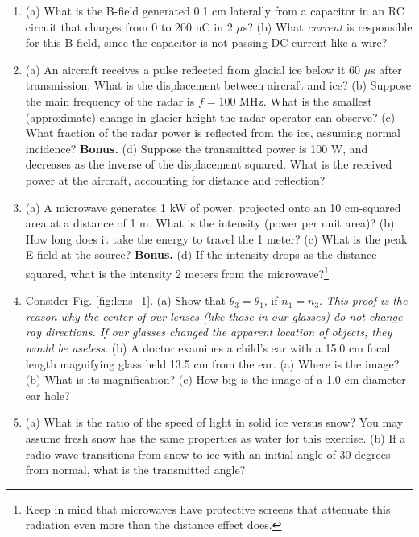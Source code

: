 \documentclass[12pt,twocolumn]{article}
\begin{document}
\noindent
\begin{enumerate}
\item (a) What is the B-field generated 0.1 cm laterally from a capacitor in an RC circuit that charges from 0 to 200 nC in 2 $\mu$s? (b) What \textit{current} is responsible for this B-field, since the capacitor is not passing DC current like a wire? \\ \vspace{1.5cm}
\item (a) An aircraft receives a pulse reflected from glacial ice below it $60$ $\mu$s after transmission. What is the displacement between aircraft and ice? (b) Suppose the main frequency of the radar is $f = 100$ MHz.  What is the smallest (approximate) change in glacier height the radar operator can observe? (c) What fraction of the radar power is reflected from the ice, assuming normal incidence? \textbf{Bonus.} (d) Suppose the transmitted power is 100 W, and decreases as the inverse of the displacement squared.  What is the received power at the aircraft, accounting for distance and reflection? \\ \vspace{4cm}
\item (a) A microwave generates 1 kW of power, projected onto an 10 cm-squared area at a distance of 1 m.  What is the intensity (power per unit area)? (b) How long does it take the energy to travel the 1 meter? (c) What is the peak E-field at the source?  \textbf{Bonus.} (d) If the intensity drops as the distance squared, what is the intensity 2 meters from the microwave?\footnote{Keep in mind that microwaves have protective screens that attenuate this radiation even more than the distance effect does.}\\ \vspace{3cm}
\item Consider Fig. \ref{fig:lens_1}.  (a) Show that $\theta_3 = \theta_1$, if $n_1 = n_3$.  \textit{This proof is the reason why the center of our lenses (like those in our glasses) do not change ray directions.  If our glasses changed the apparent location of objects, they would be useless.} (b) A doctor examines a child's ear with a 15.0 cm focal length magnifying glass held 13.5 cm from the ear. (a) Where is the image? (b) What is its magnification? (c) How big is the image of a 1.0 cm diameter ear hole? \\ \vspace{3cm}
\item (a) What is the ratio of the speed of light in solid ice versus snow?  You may assume fresh snow has the same properties as water for this exercise. (b) If a radio wave transitions from snow to ice with an initial angle of 30 degrees from normal, what is the transmitted angle? \\ \vspace{3cm}

\end{enumerate}
\end{document}

